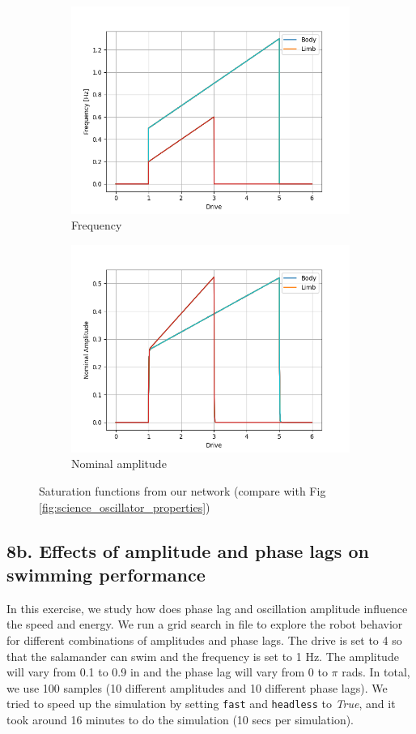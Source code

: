 \documentclass{cmc}
\begin{document}
\begin{figure}[H] 
  \begin{subfigure}[b]{0.5\linewidth}
    \centering
    \includegraphics[width=0.75\linewidth]{figures/Frequency_for_joints.png} 
    \caption{Frequency} 
    \label{fig:saturation_plot:a} 
  \end{subfigure}%
  \begin{subfigure}[b]{0.5\linewidth}
    \centering
    \includegraphics[width=0.75\linewidth]{figures/Amplitude_for_joints.png} 
    \caption{Nominal amplitude} 
    \label{fig:saturation_plot:b} 
  \end{subfigure} 
  \caption{Saturation functions from our network (compare with Fig \ref{fig:science_oscillator_properties})}
  \label{fig:saturation_plot} 
\end{figure}


\subsection*{8b. Effects of amplitude and phase lags on swimming
  performance}
\label{sec:amplitude-phase-performance}
 In this exercise, we study how does phase lag and oscillation amplitude influence the speed and energy.  We run a grid search in file 
to explore the robot behavior for different combinations of amplitudes and phase
lags. The drive is set to 4 so that the salamander can swim and the frequency is set to 1 Hz. The amplitude will vary from 0.1 to 0.9 in and the phase lag will vary from 0 to $\pi$ rads. In total, we use 100 samples (10 different amplitudes and 10 different phase lags). We tried to speed up the simulation by setting \texttt{fast} and \texttt{headless} to \textit{True}, and it took around 16 minutes to do the simulation (10 secs per simulation).
\end{document}
